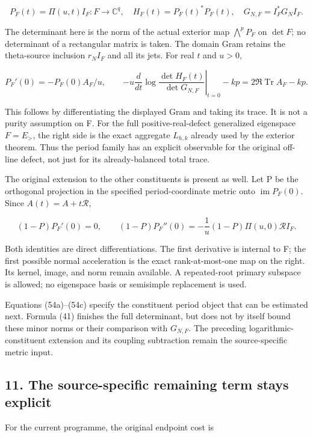 \[
P_F(t)=\Pi(u,t)I_F:F\longrightarrow\mathbb C^q,
\quad H_F(t)=P_F(t)^*P_F(t),
\quad G_{N,F}=I_F^*G_NI_F.
\tag{54a}
\]

The determinant here is the norm of the actual exterior map \(\bigwedge^p P_F\) on \(\det F\); no determinant of a rectangular matrix is taken. The domain Gram retains the theta-source inclusion \(r_NI_F\) and all its jets. For real \(t\) and \(u>0\),

\[
P_F'(0)=-P_F(0)A_F/u,
\qquad
\boxed{-u\left.\frac d{dt}\log\frac{\det H_F(t)}{\det G_{N,F}}\right|_{t=0}-kp
 =2\Re\operatorname{Tr}A_F-kp.}
\tag{54b}
\]

This follows by differentiating the displayed Gram and taking its trace. It is not a purity assumption on F. For the full positive-real-defect generalized eigenspace \(F=E_>\), the right side is the exact aggregate \(L_{h,k}\) already used by the exterior theorem. Thus the period family has an explicit observable for the original off-line defect, not just for its already-balanced total trace.

The original extension to the other constituents is present as well. Let P be the orthogonal projection in the specified period-coordinate metric onto \(\operatorname{im}P_F(0)\). Since \(A(t)=A+t\mathcal R\),

\[
\boxed{(1-P)P_F'(0)=0,\qquad
(1-P)P_F''(0)=-\frac1u(1-P)\Pi(u,0)\mathcal R I_F.}
\tag{54c}
\]

Both identities are direct differentiations. The first derivative is internal to F; the first possible normal acceleration is the exact rank-at-most-one map on the right. Its kernel, image, and norm remain available. A repeated-root primary subspace is allowed; no eigenspace basis or semisimple replacement is used.

Equations (54a)--(54c) specify the constituent period object that can be estimated next. Formula (41) finishes the full determinant, but does not by itself bound these minor norms or their comparison with \(G_{N,F}\). The preceding logarithmic-constituent extension and its coupling subtraction remain the source-specific metric input.

\subsection{11. The source-specific remaining term stays explicit}\label{endpoint-sga_trace_period--the-source-specific-remaining-term-stays-explicit}

For the current programme, the original endpoint cost is

